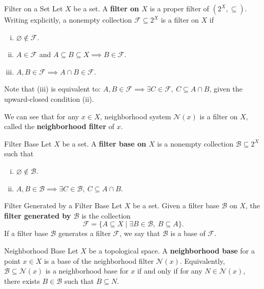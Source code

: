 \documentclass{report}
\begin{document}
\begin{definition}{Filter on a Set}{}
	Let $X$ be a set. A \textbf{filter on $X$} is a proper filter of $(2^X,\subseteq)$. Writing explicitly, a nonempty collection $\mathcal{F}\subseteq 2^X$ is a filter on $X$ if
	\begin{enumerate}[(i)]
		\item $\varnothing\notin\mathcal{F}$.
		\item $A\in\mathcal{F}$ and $A\subseteq B\subseteq X\implies B\in\mathcal{F}$.
		\item $A,B\in\mathcal{F}\implies A\cap B\in\mathcal{F}$.
	\end{enumerate}
\end{definition}

Note that (iii) is equivalent to: $A,B\in\mathcal{F}\implies \exists C\in\mathcal{F},\ C\subseteq A\cap B$, given the upward-closed condition (ii).

We can see that for any $x\in X$, neighborhood system $\mathcal{N}(x)$ is a filter on $X$, called the \textbf{neighborhood filter} of $x$.

\begin{definition}{Filter Base}{}
	Let $X$ be a set. A \textbf{filter base on $X$} is a nonempty collection $\mathcal{B}\subseteq 2^X$ such that
	\begin{enumerate}[(i)]
		\item $\varnothing\notin\mathcal{B}$.
		\item $A,B\in\mathcal{B}\implies \exists C\in\mathcal{B},\ C\subseteq A\cap B$.
	\end{enumerate}
\end{definition}

\begin{definition}{Filter Generated by a Filter Base}{}
	Let $X$ be a set. Given a filter base $\mathcal{B}$ on $X$, the \textbf{filter generated by $\mathcal{B}$} is the collection
	\[
		\mathcal{F}=\{A\subseteq X\mid \exists B\in\mathcal{B},\ B\subseteq A\}.
	\]
	If a filter base $\mathcal{B}$ generates a filter $\mathcal{F}$, we say that $\mathcal{B}$ is a base of $\mathcal{F}$.
\end{definition}

\begin{definition}{Neighborhood Base}{}
	Let $X$ be a topological space. A \textbf{neighborhood base} for a point $x\in X$ is a base of the neighborhood filter $\mathcal{N}(x)$. Equivalently, $\mathcal{B}\subseteq\mathcal{N}(x)$ is a neighborhood base for $x$ if and only if for any $N\in\mathcal{N}(x)$, there exists $B\in\mathcal{B}$ such that $B\subseteq N$.
\end{definition}
\end{document}
